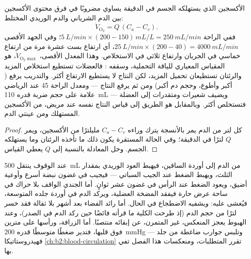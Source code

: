 \begin{theorem}\label{thm:b2:blood-pressure:fick}
الأكسجين الذي يستهلكه الجسم في الدقيقة يساوي 
مضروبًا في فرق محتوى الأكسجين بين الدم الشرياني
والدم الوريدي المختلط:
\[
\dot V_{\mathrm{O_2}} = Q\,(C_a - C_v).
\]
ففي الراحة $\qty{5}{L/min}\times(200 - 150)\,\unit{mL/L} = \qty{250}{mL/min}$؛
وفي الجهد الأقصى $\qty{25}{L/min}\times(200 - 40) =
\qty{4000}{mL/min}$، أي ارتفاع بست عشرة مرة من ارتفاع خماسي في الجريان
وارتفاع ثلاثي في الاستخلاص. وهذا المعدل الأقصى،
$\dot V_{\mathrm{O_2}\max}$، هو المقياس المعياري للياقة
التحملية، وسقفه : فالعضلات تستطيع استخلاص
المزيد والرئتان تستطيعان تحميل المزيد، لكن النتاج لا
يستطيع الارتفاع أكثر. والتدريب يرفع  ( أكبر وأطوع،
وحجم دم أكبر) ومن ثم يرفع النتاج --- ومعدل الراحة 45
عند الرياضي علامة على حجم ضربة قدره
\qty{110}{mL} --- ويضيف شعيرات ومتقدرات إلى العضلة
فتستخلص أكثر. وبالمقابل  هو الطريق إلى قياس
النتاج نفسه عند مريض، من الأكسجين المستهلك ومن
عينتي الدم.
\end{theorem}
\begin{proof}
كل لتر من الدم يمر بالأنسجة يترك وراءه $C_a - C_v$
مليلترًا من الأكسجين، ويمر $Q$ لترًا في الدقيقة؛ وفي
الحالة المستقرة يكون ذلك ما تأخذه الرئتان وما يستهلكه الجسم.
وحل المعادلة بالنسبة إلى $Q$ يعطي القياس.
\end{proof}

\begin{example}\label{ex:b2:blood-pressure:standing}
عند الوقوف ينتقل \qty{500}{mL} من الدم إلى أوردة الساقين، فيهبط
العود الوريدي  بمقدار الثلث، ويهبط
الضغط عند الجيب السباتي --- فيجيب  في غضون
نبضة  أسرع وأوعية أضيق، ويعود الضغط عند
الرأس في غضون عشر ثوانٍ. أما الجندي الواقف بلا حراك
في ساحة عرض حارة فيفقد المضخة العضلية، ويركد الدم في
أوردة جلده المتوسعة، فيُغشى عليه: ويشفيه الاضطجاع في الحال. أما
رائد الفضاء بعد أشهر بلا ثقالة فقد خسر لترًا من حجم
الدم (إذ طرحت الكلية ما قرأته فائضًا حين ركد الدم
في الصدر)، وعند الهبوط يعجز المنعكس، غير المتمرن، عن
إبقائه منتصبًا. أما الزرافة، ورأسها على مترين فوق
قلبها، فتدير ضغطًا متوسطًا قدره \qty{200}{mmHg} وتلبس
جوارب ضاغطة من جلد --- فهيدروستاتيكا
\cref{ch:b2:blood-circulation} تقرر المتطلبات، ومنعكسات
هذا الفصل تفي بها.
\end{example}

